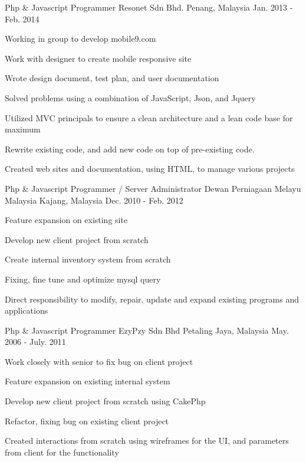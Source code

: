 \begin{cventries}
  \cventry
    {Php \& Javascript Programmer} %
    {Resonet Sdn Bhd.} %
    {Penang, Malaysia} %
    {Jan. 2013 - Feb. 2014} %
    {
      \begin{cvitems} %
        \item Working in group to develop mobile9.com
        \item Work with designer to create mobile responsive site
        \item Wrote design document, test plan, and user documentation
        \item Solved problems using a combination of JavaScript, Json, and Jquery
        \item Utilized MVC principals to ensure a clean architecture and a lean code base for maximum
        \item Rewrite existing code, and add new code on top of pre-existing code.
        \item Created web sites and documentation, using HTML, to manage various projects
      \end{cvitems}
    }

  \cventry
    {Php \& Javascript Programmer / Server Administrator} %
    {Dewan Perniagaan Melayu Malaysia} %
    {Kajang, Malaysia} %
    {Dec. 2010 - Feb. 2012} %
    {
      \begin{cvitems} %
        \item Feature expansion on existing site
        \item Develop new client project from scratch
        \item Create internal inventory system from scratch
        \item Fixing, fine tune and optimize mysql query
        \item Direct responsibility to modify, repair, update and expand existing programs and applications
      \end{cvitems}
    }
    
    
  \cventry
    {Php \& Javascript Programmer} %
    {EzyPzy Sdn Bhd} %
    {Petaling Jaya, Malaysia} %
    {May. 2006 - July. 2011} %
    {
      \begin{cvitems} %
      	\item Work closely with senior to fix bug on client project
      	\item Feature expansion on existing internal system
      	\item Develop new client project from scratch using CakePhp
        \item Refactor, fixing bug on existing client project
        \item Created interactions from scratch using wireframes for the UI, and parameters from client for the functionality
      \end{cvitems}
    }


\end{cventries}
